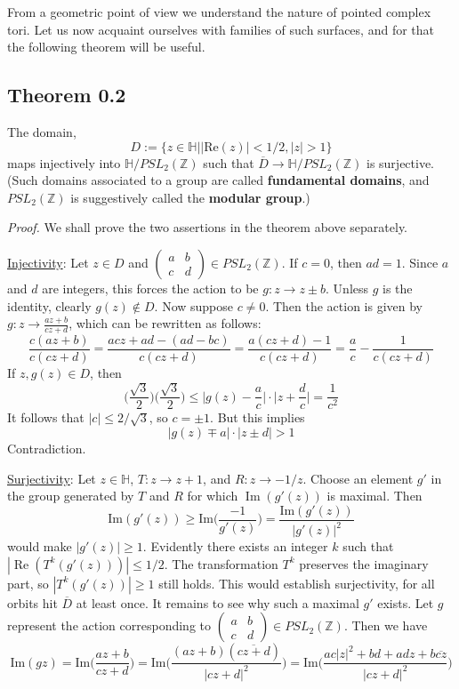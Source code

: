 \documentclass[11pt,a4paper]{article}
\begin{document}
From a geometric point of view we understand the nature of pointed complex tori. Let us now acquaint ourselves with families of such surfaces, and for that the following theorem will be useful.

\subsection*{Theorem 0.2}
    The domain,
    $$D:= \{z\in \mathbb{H}   |   |\text{Re}(z)| <1/2,   |z|>1\}$$
    maps injectively into $\mathbb{H}/PSL_2(\mathbb{Z})$ such that $\overline{D} \rightarrow \mathbb{H}/PSL_2(\mathbb{Z})$ is surjective. (Such domains associated to a group are called \textbf{fundamental domains}, and $PSL_2(\mathbb{Z})$ is suggestively called the \textbf{modular group}.)

\textit{Proof.}
    We shall prove the two assertions in the theorem above separately.

    \underline{Injectivity}: Let $z\in D$ and $\begin{pmatrix}
        a&b\\c&d
    \end{pmatrix} \in PSL_2(\mathbb{Z})$. If $c=0$, then $ad=1$. Since $a$ and $d$ are integers, this forces the action to be $g: z\rightarrow z\pm b$. Unless $g$ is the identity, clearly $g(z) \notin D$. Now suppose $c\neq 0$. Then the action is given by $g: z\rightarrow \frac{az+b}{cz+d}$, which can be rewritten as follows:
    $$\frac{c(az+b)}{c(cz+d)} = \frac{acz +ad - (ad-bc)}{c(cz+d)} = \frac{a(cz+d) - 1}{c(cz+d)} = \frac{a}{c} - \frac{1}{c(cz+d)}$$
    If $z, g(z) \in D$, then
    $$\bigg(\frac{\sqrt{3}}{2}\bigg)\bigg(\frac{\sqrt{3}}{2}\bigg) \leq \bigg|g(z) - \frac{a}{c}\bigg|\cdot\bigg|z+\frac{d}{c}\bigg| = \frac{1}{c^2}$$
    It follows that $|c|\leq 2/\sqrt{3}$, so $c=\pm1$. But this implies
    $$|g(z)\mp a|\cdot |z\pm d| >1$$
    Contradiction.

    \underline{Surjectivity}: Let $z \in \mathbb{H}$, $T: z\rightarrow z+1$, and $R: z\rightarrow -1/z$. Choose an element $g'$ in the group generated by $T$ and $R$ for which $\operatorname{Im}(g'(z))$ is maximal. Then
    $$\text{Im}(g'(z)) \geq \text{Im}\bigg(\frac{-1}{g'(z)}\bigg) = \frac{\text{Im}(g'(z))}{|g'(z)|^2}$$
    would make $|g'(z)| \geq 1$. Evidently there exists an integer $k$ such that $|\operatorname{Re}(T^k(g'(z)))|\leq1/2$. The transformation $T^k$ preserves the imaginary part, so $|T^k(g'(z))|\geq1$ still holds. This would establish surjectivity, for all orbits hit $\overline{D}$ at least once. It remains to see why such a maximal $g'$ exists. Let $g$ represent the action corresponding to $\begin{pmatrix}
        a&b\\c&d
    \end{pmatrix} \in PSL_2(\mathbb{Z})$. Then we have
    $$\text{Im}(gz) = \text{Im}\bigg(\frac{az+b}{cz+d}\bigg) = \text{Im}\bigg(\frac{(az+b)(\overline{cz+d})}{|cz+d|^2}\bigg) = \text{Im}\bigg(\frac{ac|z|^2 + bd + adz + b\overline{cz}}{|cz+d|^2}\bigg)$$
\end{document}
